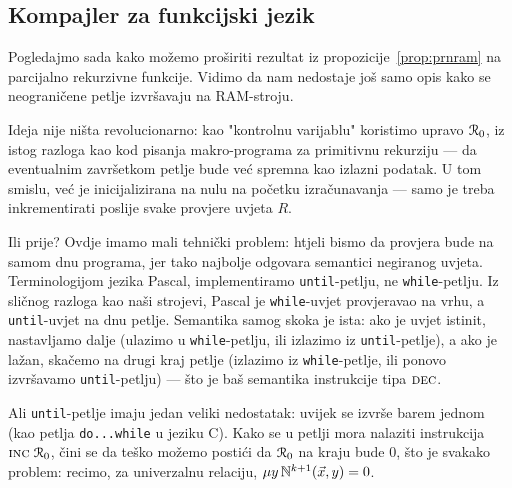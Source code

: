 
\subsection{Kompajler za funkcijski jezik}\label{sec:pir}

Pogledajmo sada kako možemo proširiti rezultat iz propozicije~\ref{prop:prnram} na parcijalno rekurzivne funkcije. Vidimo da nam nedostaje još samo opis kako se neograničene petlje izvršavaju na RAM-stroju.

Ideja nije ništa revolucionarno: kao "kontrolnu varijablu" koristimo upravo $\mathcal R_{0}$, iz istog razloga kao kod pisanja makro-programa za primitivnu rekurziju --- da eventualnim završetkom petlje bude već spremna kao izlazni podatak. U tom smislu, već je inicijalizirana na nulu na početku izračunavanja --- samo je treba inkrementirati poslije svake provjere uvjeta $R$.

Ili prije? Ovdje imamo mali tehnički problem: htjeli bismo da provjera bude na samom dnu programa, jer tako najbolje odgovara semantici negiranog uvjeta. Terminologijom jezika Pascal, implementiramo \texttt{until}-petlju, ne \texttt{while}-petlju. Iz sličnog razloga kao naši strojevi, Pascal je \texttt{while}-uvjet provjeravao na vrhu, a \texttt{until}-uvjet na dnu petlje. Semantika samog skoka je ista: ako je uvjet istinit, nastavljamo dalje (ulazimo u \texttt{while}-petlju, ili izlazimo iz \texttt{until}-petlje), a ako je lažan, skačemo na drugi kraj petlje (izlazimo iz \texttt{while}-petlje, ili ponovo izvršavamo \texttt{until}-petlju) --- što je baš semantika instrukcije tipa $\textsc{dec}$.

Ali \texttt{until}-petlje imaju jedan veliki nedostatak: uvijek se izvrše barem jednom (kao petlja \texttt{do...while} u jeziku C). Kako se u petlji mora nalaziti instrukcija $\textsc{inc}\;\mathcal R_{0}$, čini se da teško možemo postići da $\mathcal R_{0}$ na kraju bude $0$, što je svakako problem: recimo, za univerzalnu relaciju, $\mu y\,{\mathbb N}^{k+1}(\vec x,y)=0$.

